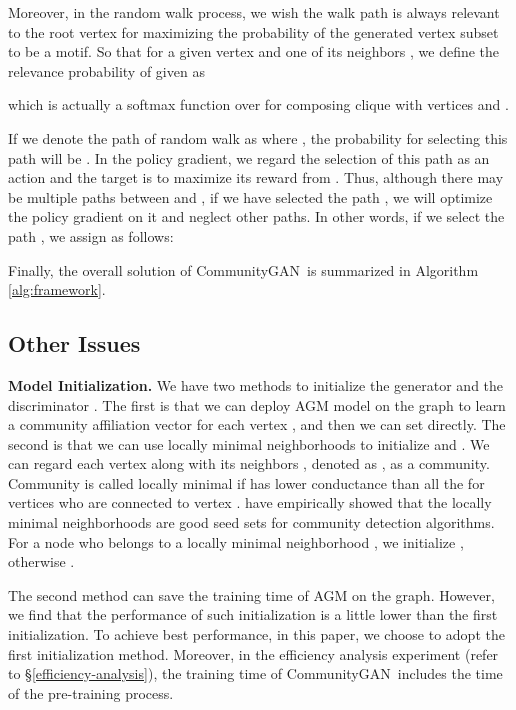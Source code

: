 \documentclass[sigconf]{acmart}
\newcommand{\ComGAN}{CommunityGAN}
\begin{document}
Moreover, in the random walk process, we wish the walk path is always relevant to the root vertex  for maximizing the probability of the generated vertex subset to be a motif.
So that for a given vertex  and one of its neighbors , we define the relevance probability of  given  as

which is actually a softmax function over  for composing clique with vertices  and .

If we denote the path of random walk as  where , the probability for selecting this path will be .
In the policy gradient, we regard the selection of this path as an action and the target is to maximize its reward from .
Thus, although there may be multiple paths between  and , if we have selected the path , we will optimize the policy gradient on it and neglect other paths.
In other words, if we select the path , we assign  as follows:


Finally, the overall solution of \ComGAN~is summarized in Algorithm \ref{alg:framework}.


\subsection{Other Issues}

\vspace{5pt}\noindent\textbf{Model Initialization.}
We have two methods to initialize the generator  and the discriminator .
The first is that we can deploy AGM model on the graph to learn a community affiliation vector  for each vertex , and then we can set  directly.
The second is that we can use locally minimal neighborhoods \cite{Neighborhoods-2012} to initialize  and .
We can regard each vertex  along with its neighbors , denoted as , as a community.
Community  is called locally minimal if  has lower conductance than all the  for vertices  who are connected to vertex .
\citet{Neighborhoods-2012} have empirically showed that the locally minimal neighborhoods are good seed sets for community detection algorithms.
For a node  who belongs to a locally minimal neighborhood , we initialize , otherwise .

The second method can save the training time of AGM on the graph.
However, we find that the performance of such initialization is a little lower than the first initialization.
To achieve best performance, in this paper, we choose to adopt the first initialization method.
Moreover, in the efficiency analysis experiment (refer to \S \ref{efficiency-analysis}), the training time of \ComGAN~includes the time of the pre-training process.
\end{document}
